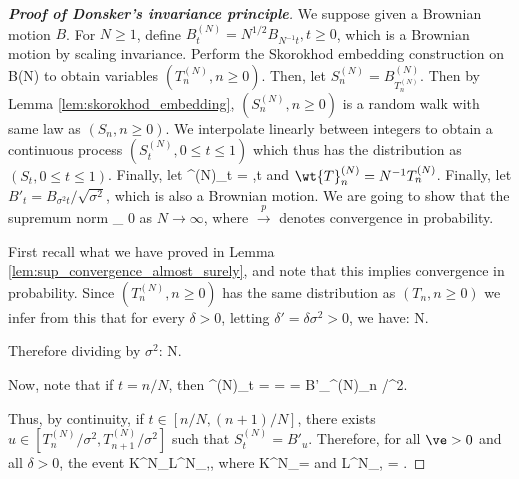 \begin{proof}[\bf Proof of Donsker's invariance principle]
We suppose given a Brownian motion $B$. For $N \geq 1$, define $B^{(N)}_t = N^{1/2}B_{N^{-1}t}, t \geq 0$, which is a Brownian motion by scaling invariance.
Perform the Skorokhod embedding construction on B(N) to obtain variables $(T^{(N)}_n , n \geq 0)$. Then, let $S^{(N)}_n = B^{(N)}_{T^{(N)}_n}$. Then by Lemma \ref{lem:skorokhod_embedding}, $(S^{(N)}_n , n \geq 0)$ is a random walk with same law as $(S_n, n \geq 0)$. We interpolate linearly between integers to obtain a continuous process $(S^{(N)}_t , 0 \leq t \leq 1)$ which thus has the distribution as $(S_t, 0 \leq t \leq 1)$. Finally, let
\be
{}^{(N)}_t = ,\quad t 
\ee
and $\wt{T}^{(N)}_n = N^{-1}T^{(N)}_n$. Finally, let $B'_t = B_{\sigma^2t}/\sqrt{\sigma^2}$, which is also a Brownian motion. We are going to show that the supremum norm
\be
{}_\infty {} 0
\ee
as $N\to\infty$, where $\stackrel{p}{\to}$ denotes convergence in probability.

First recall what we have proved in Lemma \ref{lem:sup_convergence_almost_surely}, and note that this implies convergence in probability. Since $(T^{(N)}_n , n \geq 0)$ has the same distribution as $(T_n, n \geq 0)$ we infer from this that for every $\delta > 0$, letting $\delta' = \delta \sigma^2 > 0$, we have:
\be
\pro{} \quad{}N\to \infty.
\ee

Therefore dividing by $\sigma^2$:
\be
\pro{} \quad{}N\to \infty.
\ee

Now, note that if $t = n/N$, then
\be
{}^{(N)}_t =  =  = B'_{^{(N)}_n /\sigma^2}.
\ee

Thus, by continuity, if $t\in [n/N, (n + 1)/N]$, there exists $u \in [T^{(N)}_n/\sigma^2, T^{(N)}_{n+1}/\sigma^2]$ such that $S^{(N)}_t = B'_u$. Therefore, for all $\ve > 0$ and all $\delta > 0$, the event
\be
{} \subseteq  K^N_\delta \cup L^N_{\delta,\ve},
\ee
where
\be
K^N_\delta = 
\ee
and
\be
L^N_{\delta,\ve} = .
\ee


\end{proof}
